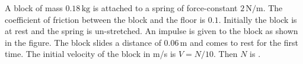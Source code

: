 
\item A block of mass \(0.18 \, \text{kg}\) is attached to a spring of force-constant \(2 \, \text{N/m}\). The coefficient of friction between the block and the floor is \(0.1\). Initially the block is at rest and the spring is un-stretched. An impulse is given to the block as shown in the figure. The block slides a distance of \(0.06 \, \text{m}\) and comes to rest for the first time. The initial velocity of the block in m/s is \(V = N/10\). Then \(N\) is \underline{\hspace{2.5cm}}.
    \begin{center}
    \end{center}
